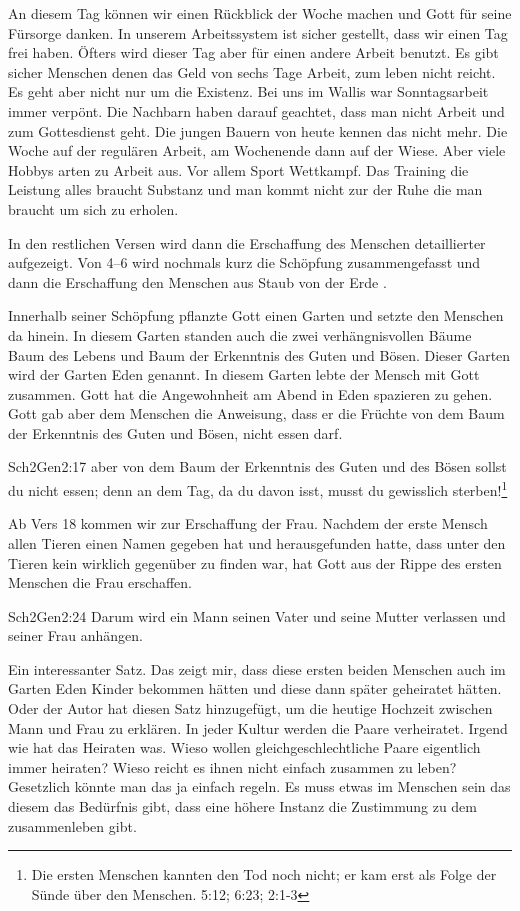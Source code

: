 An diesem Tag können wir einen Rückblick der Woche machen und Gott für seine Fürsorge danken. In unserem Arbeitssystem ist sicher gestellt, dass wir einen Tag frei haben. Öfters wird dieser Tag aber für einen andere Arbeit benutzt. Es gibt sicher Menschen denen das Geld von sechs Tage Arbeit, zum leben nicht reicht. Es geht aber nicht nur um die Existenz. Bei uns im Wallis war Sonntagsarbeit immer verpönt. Die Nachbarn haben darauf geachtet, dass man nicht Arbeit und zum Gottesdienst geht. Die jungen Bauern von heute kennen das nicht mehr. Die Woche auf der regulären Arbeit, am Wochenende dann auf der Wiese. Aber viele Hobbys arten zu Arbeit aus. Vor allem Sport Wettkampf. Das Training die Leistung alles braucht Substanz und man kommt nicht zur der Ruhe die man braucht um sich zu erholen.

In den restlichen Versen wird dann die Erschaffung des Menschen detaillierter aufgezeigt. Von 4--6 wird nochmals kurz die Schöpfung zusammengefasst und dann die Erschaffung den Menschen aus \flqq Staub von der Erde \frqq. 

Innerhalb seiner Schöpfung pflanzte Gott einen Garten und setzte den Menschen da hinein. In diesem Garten standen auch die zwei verhängnisvollen Bäume \flqq Baum des Lebens\frqq{} und \flqq Baum der Erkenntnis des Guten und Bösen\frqq. Dieser Garten wird der Garten Eden genannt. In diesem Garten lebte der Mensch mit Gott zusammen. Gott hat die Angewohnheit am Abend in Eden spazieren zu gehen. Gott gab aber dem Menschen die Anweisung, dass er die Früchte von dem \flqq Baum der Erkenntnis des Guten und Bösen\flqq, nicht essen darf.
\begin{bibeltext}{Sch2}{Gen}{2:17}
	aber von dem Baum der Erkenntnis des Guten und des Bösen sollst du nicht essen; denn an dem Tag, da du davon isst, musst du gewisslich sterben!\footnote{Die ersten Menschen kannten den Tod noch nicht; er kam erst als Folge der Sünde über den Menschen.  {5:12};  {6:23};  {2:1-3}} 
\end{bibeltext}

Ab Vers 18 kommen wir zur Erschaffung der Frau. Nachdem der erste Mensch allen Tieren einen Namen gegeben hat und herausgefunden hatte, dass unter den Tieren kein wirklich gegenüber zu finden war, hat Gott aus der Rippe des ersten Menschen die Frau erschaffen. 
\begin{bibeltext}{Sch2}{Gen}{2:24}
	Darum wird ein Mann seinen Vater und seine Mutter verlassen und seiner Frau anhängen.	
\end{bibeltext}
Ein interessanter Satz. Das zeigt mir, dass diese ersten beiden Menschen auch im Garten Eden Kinder bekommen hätten und diese dann später geheiratet hätten. Oder der Autor hat diesen Satz hinzugefügt, um die heutige Hochzeit zwischen Mann und Frau zu erklären. In jeder Kultur werden die Paare verheiratet. Irgend wie hat das Heiraten was. Wieso wollen gleichgeschlechtliche Paare eigentlich immer heiraten? Wieso reicht es ihnen nicht einfach zusammen zu leben? Gesetzlich könnte man das ja einfach regeln. Es muss etwas im Menschen sein das diesem das Bedürfnis gibt, dass eine höhere Instanz die Zustimmung zu dem zusammenleben gibt.

